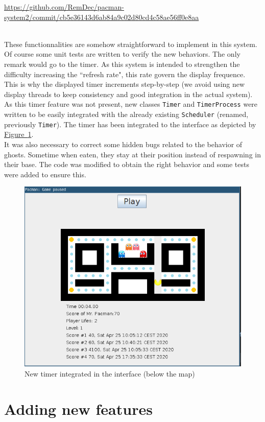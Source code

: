 \documentclass[]{article}
\newcommand{\wordlink}[2]{\hyperref[#2]{#1~\ref{#2}}}
\begin{document}
\url{https://github.com/RemDec/pacman-system2/commit/cb5e36143d6ab84a9c02d80cd4c58ae56ff0e8aa}

 ~\\

These functionnalities are somehow straightforward to implement in this system. Of course some unit tests are written to verify the new behaviors. The only remark would go to the timer. As this system is intended to strengthen the difficulty increasing the ``refresh rate", this rate govern the display frequence. This is why the displayed timer increments step-by-step (we avoid using new display threads to keep consistency and good integration in the actual system). As this timer feature was not present, new classes \texttt{Timer} and \texttt{TimerProcess} were written to be easily integrated with the already existing \texttt{Scheduler} (renamed, previously \texttt{Timer}). The timer has been integrated to the interface as depicted by \wordlink{Figure}{fig:S2_timer}.\\

It was also necessary to correct some hidden bugs related to the behavior of ghosts. Sometime when eaten, they stay at their position instead of respawning in their base. The code was modified to obtain the right behavior and some tests were added to ensure this. \\


\begin{figure}[h]
\centering
\includegraphics[width=0.6\linewidth]{S2-screen_timer}
\caption{New timer integrated in the interface (below the map)}
\label{fig:S2_timer}
\end{figure}

\newpage
\section{Adding new features}
\end{document}
